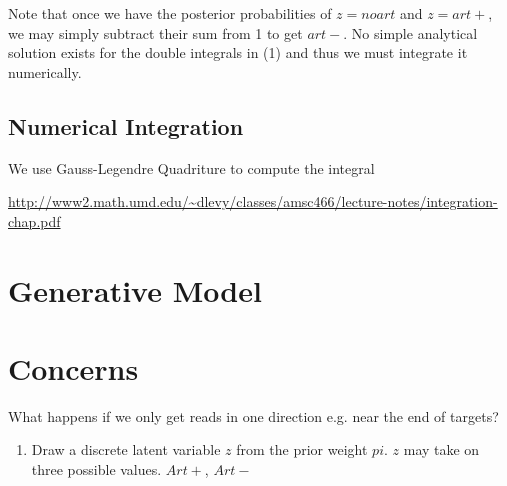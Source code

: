 \documentclass[a4paper]{article}
\begin{document}
Note that once we have the posterior probabilities of $z = noart$ and $z = art+$, we may simply subtract their sum from 1 to get $art-$. No simple analytical solution exists for the double integrals in (1) and thus we must integrate it numerically.

\subsection{Numerical Integration}
We use Gauss-Legendre Quadriture to compute the integral 

\url{http://www2.math.umd.edu/~dlevy/classes/amsc466/lecture-notes/integration-chap.pdf}

\section{Generative Model}

\section{Concerns}
What happens if we only get reads in one direction e.g. near the end of targets?


\begin{enumerate}
\item Draw a discrete latent variable $z$ from the prior weight $pi$. $z$ may take on three possible values. $Art+$, $Art-$
\end{enumerate}
\end{document}
